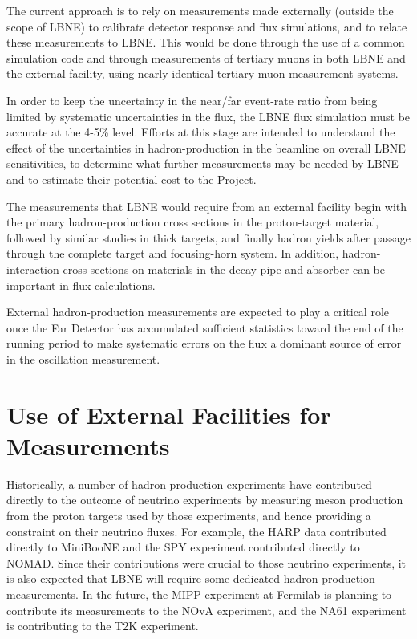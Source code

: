 The current approach is to rely on measurements made externally (outside the scope of LBNE) to calibrate detector response and flux simulations, and to relate 
these measurements to LBNE. This would be done through the use of a common simulation code and through measurements of tertiary muons in both LBNE and the external facility, using nearly identical tertiary muon-measurement systems. 

In order to keep the uncertainty in the near/far event-rate ratio from being
limited by systematic uncertainties in the flux, the LBNE flux simulation 
 must be accurate at the 4-5\% level.
Efforts at this stage are intended to understand the effect of the uncertainties in hadron-production in the beamline on overall LBNE
sensitivities, to determine what further measurements may be needed
by LBNE and to estimate their potential cost to the Project.

The measurements that LBNE would require from an external facility begin with the primary hadron-production cross
sections in the proton-target material, followed by similar studies in
thick targets, and finally hadron yields after passage through the complete target and
focusing-horn system. In addition, hadron-interaction cross sections
on materials in the decay pipe and absorber can be important in
flux calculations.

External hadron-production measurements are expected to play
a critical role once the Far Detector has accumulated sufficient
statistics toward the end of the running period to make systematic errors
on the flux a dominant source of error in the oscillation measurement. 

\section{Use of External Facilities for Measurements}

Historically, a number of hadron-production experiments have
contributed directly to the outcome of neutrino experiments
by measuring meson production from the proton targets used
by those experiments, and hence providing a constraint on their neutrino fluxes. 
For example, the HARP data\cite{ref:HARP} contributed directly to
MiniBooNE and the SPY\cite{ref:SPY} experiment contributed directly to
NOMAD. Since their contributions were crucial to those neutrino experiments, 
it is also expected that LBNE will require some dedicated hadron-production measurements.
In the future, the MIPP experiment at Fermilab is planning to contribute its
measurements to the NOvA experiment, and the NA61
experiment\cite{Abgrall:2011ae} is contributing to the T2K
experiment.


